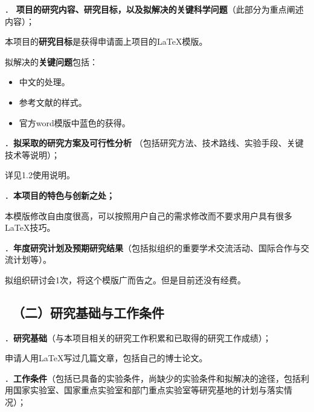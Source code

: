\documentclass[12pt,UTF8,AutoFakeBold=2,a4paper]{ctexart} %
\newcommand{\sihao}{\fontsize{14pt}{\baselineskip}\selectfont}
\begin{document}
%
{

}
\newpage

{\sihao \color{MsBlue} ． {\bfseries 项目的研究内容、研究目标，以及拟解决的关键科学问题}（此部分为重点阐述内容）；}

本项目的{\bfseries 研究目标}是获得申请面上项目的\LaTeX 模版。

拟解决的{\bfseries 关键问题}包括：

\begin{itemize}
\item 中文的处理。
\item 参考文献\cite{John1997,Smith1900,Piter1992}的样式。
\item 官方word模版中蓝色的获得。
\end{itemize}




{\sihao \color{MsBlue} ．{\bfseries 拟采取的研究方案及可行性分析} （包括研究方法、技术路线、实验手段、关键技术等说明）；}

详见1.2使用说明。

{\sihao \color{MsBlue} ．{\bfseries 本项目的特色与创新之处；}}

本模版修改自由度很高，可以按照用户自己的需求修改而不要求用户具有很多\LaTeX 技巧。


{\sihao \color{MsBlue} ．{\bfseries 年度研究计划及预期研究结果}（包括拟组织的重要学术交流活动、国际合作与交流计划等）。}

拟组织研讨会1次，将这个模版广而告之。但是目前还没有经费。

\vskip -5mm %

{\color{MsBlue} \subsection{\sihao \kaishu \quad \ （二）研究基础与工作条件 }}

{\sihao \color{MsBlue} ．{\bfseries 研究基础}（与本项目相关的研究工作积累和已取得的研究工作成绩）；}

申请人用\LaTeX 写过几篇文章，包括自己的博士论文。

{\sihao \color{MsBlue} ．{\bfseries 工作条件}（包括已具备的实验条件，尚缺少的实验条件和拟解决的途径，包括利用国家实验室、国家重点实验室和部门重点实验室等研究基地的计划与落实情况）；}
\end{document}
